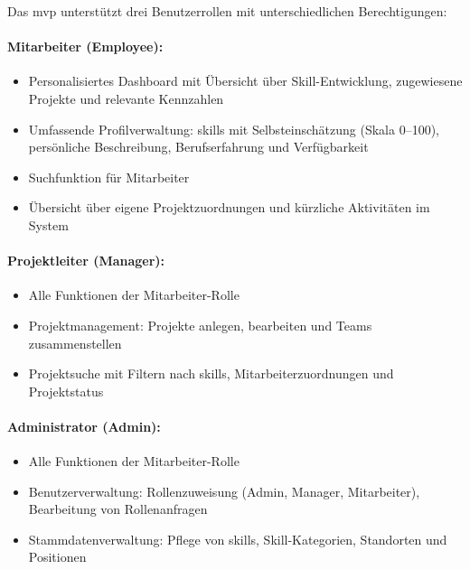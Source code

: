 Das \gls{mvp} unterstützt drei Benutzerrollen mit unterschiedlichen Berechtigungen:

\paragraph{Mitarbeiter (Employee):}
\begin{itemize}
    \item Personalisiertes Dashboard mit Übersicht über Skill-Entwicklung, zugewiesene Projekte und relevante Kennzahlen
    \item Umfassende Profilverwaltung: \glspl{skill} mit Selbsteinschätzung (Skala 0--100), persönliche Beschreibung, Berufserfahrung und Verfügbarkeit
    \item Suchfunktion für Mitarbeiter
    \item Übersicht über eigene Projektzuordnungen und kürzliche Aktivitäten im System
\end{itemize}

\paragraph{Projektleiter (Manager):}
\begin{itemize}
    \item Alle Funktionen der Mitarbeiter-Rolle
    \item Projektmanagement: Projekte anlegen, bearbeiten und Teams zusammenstellen
    \item Projektsuche mit Filtern nach \glspl{skill}, Mitarbeiterzuordnungen und Projektstatus
\end{itemize}

\paragraph{Administrator (Admin):}
\begin{itemize}
    \item Alle Funktionen der Mitarbeiter-Rolle
    \item Benutzerverwaltung: Rollenzuweisung (Admin, Manager, Mitarbeiter), Bearbeitung von Rollenanfragen
    \item Stammdatenverwaltung: Pflege von \glspl{skill}, Skill-Kategorien, Standorten und Positionen
\end{itemize}

